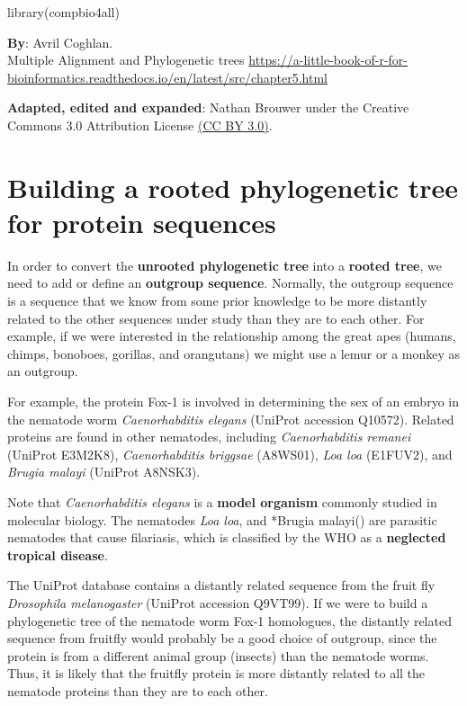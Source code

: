 \documentclass[
]{book}
\newenvironment{Shaded}{\begin{snugshade}}{\end{snugshade}}
\newcommand{\FunctionTok}[1]{\textcolor[rgb]{0.00,0.00,0.00}{#1}}
\newcommand{\NormalTok}[1]{#1}
\begin{document}
\begin{Shaded}
\begin{Highlighting}[]
\FunctionTok{library}\NormalTok{(compbio4all)}
\end{Highlighting}
\end{Shaded}

\textbf{By}: Avril Coghlan.\\
Multiple Alignment and Phylogenetic trees
\url{https://a-little-book-of-r-for-bioinformatics.readthedocs.io/en/latest/src/chapter5.html}

\textbf{Adapted, edited and expanded}: Nathan Brouwer under the Creative Commons 3.0 Attribution License \href{https://creativecommons.org/licenses/by/3.0/}{(CC BY 3.0)}.

\hypertarget{building-a-rooted-phylogenetic-tree-for-protein-sequences}{%
\section{Building a rooted phylogenetic tree for protein sequences}\label{building-a-rooted-phylogenetic-tree-for-protein-sequences}}

In order to convert the \textbf{unrooted phylogenetic tree} into a \textbf{rooted tree}, we need to add or define an \textbf{outgroup sequence}. Normally, the outgroup sequence is a sequence that we know from some prior knowledge to be more distantly related to the other sequences under study than they are to each other. For example, if we were interested in the relationship among the great apes (humans, chimps, bonoboes, gorillas, and orangutans) we might use a lemur or a monkey as an outgroup.

For example, the protein Fox-1 is involved in determining the sex of an embryo in the nematode worm \emph{Caenorhabditis elegans} (UniProt accession Q10572). Related proteins are found in other nematodes, including \emph{Caenorhabditis remanei} (UniProt E3M2K8), \emph{Caenorhabditis briggsae} (A8WS01), \emph{Loa loa} (E1FUV2), and \emph{Brugia malayi} (UniProt A8NSK3).

Note that \emph{Caenorhabditis elegans} is a \textbf{model organism} commonly studied in molecular biology. The nematodes \emph{Loa loa}, and *Brugia malayi() are parasitic nematodes that cause filariasis, which is classified by the WHO as a \textbf{neglected tropical disease}.

The UniProt database contains a distantly related sequence from the fruit fly \emph{Drosophila melanogaster} (UniProt accession Q9VT99). If we were to build a phylogenetic tree of the nematode worm Fox-1 homologues, the distantly related sequence from fruitfly would probably be a good choice of outgroup, since the protein is from a different animal group (insects) than the nematode worms. Thus, it is likely that the fruitfly protein is more distantly related to all the nematode proteins than they are to each other.
\end{document}
